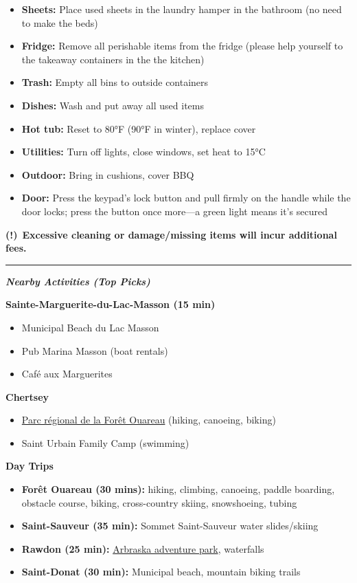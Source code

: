 \documentclass[11pt,a4paper]{article}
\newcommand{\mysection}[1]{
    \vspace{1.5em}
    {\color{skybluescript}\huge\bfseries\itshape #1}
    \vspace{1em}
    \newline
}
\newcommand{\checkitem}{\ding{51}}
\newcommand{\warnsign}{\textbf{\color{red}(!)}}
\newcommand{\separator}{\vspace{1em}\hrule\vspace{1em}}
\begin{document}
\begin{itemize}
    \item[\checkitem] \textbf{Sheets:} Place used sheets in the laundry hamper in the bathroom (no need to make the beds)
    \item[\checkitem] \textbf{Fridge:} Remove all perishable items from the fridge (please help yourself to the takeaway containers in the the kitchen)
    \item[\checkitem] \textbf{Trash:} Empty all bins to outside containers
    \item[\checkitem] \textbf{Dishes:} Wash and put away all used items
    \item[\checkitem] \textbf{Hot tub:} Reset to 80°F (90°F in winter), replace cover
    \item[\checkitem] \textbf{Utilities:} Turn off lights, close windows, set heat to 15°C
    \item[\checkitem] \textbf{Outdoor:} Bring in cushions, cover BBQ
    \item[\checkitem] \textbf{Door:} Press the keypad's lock button and pull firmly on the handle while the door locks; press the button once more---a green light means it's secured
\end{itemize}

\vspace{1em}
\warnsign \ \textbf{Excessive cleaning or damage/missing items will incur additional fees.}

\separator


\mysection{Nearby Activities (Top Picks)}

\textbf{Sainte-Marguerite-du-Lac-Masson (15 min)}
\begin{itemize}
    \item Municipal Beach du Lac Masson
    \item Pub Marina Masson (boat rentals)
    \item Café aux Marguerites
\end{itemize}

\textbf{Chertsey}
\begin{itemize}
    \item \href{https://www.parcsregionaux.org/parcs-regionaux/parcs/parc-regional-de-la-foret-ouareau/}{Parc régional de la Forêt Ouareau} (hiking, canoeing, biking)
    \item Saint Urbain Family Camp (swimming)
\end{itemize}

\textbf{Day Trips}
\begin{itemize}
    \item \textbf{Forêt Ouareau (30 mins):} hiking, climbing, canoeing, paddle boarding, obstacle course, biking, cross-country skiing, snowshoeing, tubing
    \item \textbf{Saint-Sauveur (35 min):} Sommet Saint-Sauveur water slides/skiing
    \item \textbf{Rawdon (25 min):} \href{https://arbraska.com/en/parks/rawdon/}{Arbraska adventure park}, waterfalls
    \item \textbf{Saint-Donat (30 min):} Municipal beach, mountain biking trails
\end{itemize}
\end{document}

